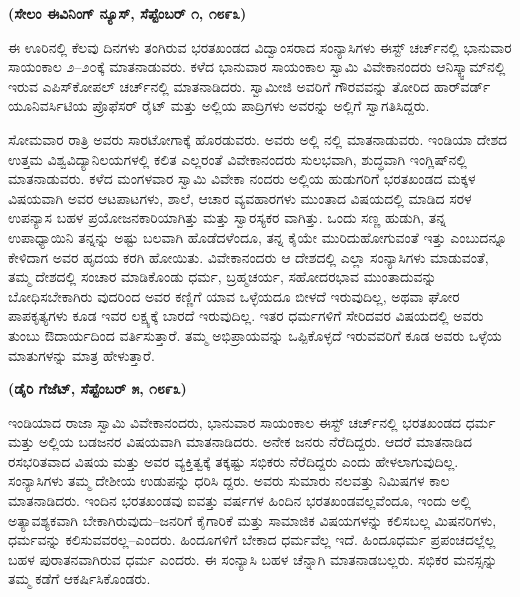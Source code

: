 \delimiter

\begin{center}
\textbf{(ಸೇಲಂ ಈವಿನಿಂಗ್​ ನ್ಯೂಸ್​, ಸೆಪ್ಟೆಂಬರ್​ ೧, ೧೮೯೩)}
\end{center}

ಈ ಊರಿನಲ್ಲಿ ಕೆಲವು ದಿನಗಳು ತಂಗಿರುವ ಭರತಖಂಡದ ವಿದ್ವಾಂಸರಾದ ಸಂನ್ಯಾಸಿಗಳು ಈಸ್ಟ್​ ಚರ್ಚ್​ನಲ್ಲಿ ಭಾನುವಾರ ಸಾಯಂಕಾಲ ೨–೨೦ಕ್ಕೆ ಮಾತನಾಡುವರು. ಕಳೆದ ಭಾನುವಾರ ಸಾಯಂಕಾಲ ಸ್ವಾಮಿ ವಿವೇಕಾನಂದರು ಆನಿಸ್ಕ್ವಾಮ್​ನಲ್ಲಿ ಇರುವ ಎಪಿಸ್​ಕೋಪಲ್​ ಚರ್ಚ್​ನಲ್ಲಿ ಮಾತನಾಡಿದರು. ಸ್ವಾಮೀಜಿ ಅವರಿಗೆ ಗೌರವವನ್ನು ತೋರಿದ ಹಾರ್​ವರ್ಡ್​ ಯೂನಿವರ್ಸಿಟಿಯ ಪ್ರೊಫೆಸರ್​ ರೈಟ್​ ಮತ್ತು ಅಲ್ಲಿಯ ಪಾದ್ರಿಗಳು ಅವರನ್ನು ಅಲ್ಲಿಗೆ ಸ್ವಾಗತಿಸಿದ್ದರು.

ಸೋಮವಾರ ರಾತ್ರಿ ಅವರು ಸಾರಟೋಗಾಕ್ಕೆ ಹೊರಡುವರು. ಅವರು ಅಲ್ಲಿ  ನಲ್ಲಿ ಮಾತನಾಡುವರು. ಇಂಡಿಯಾ ದೇಶದ ಉತ್ತಮ ವಿಶ್ವವಿದ್ಯಾನಿಲಯಗಳಲ್ಲಿ ಕಲಿತ ಎಲ್ಲರಂತೆ ವಿವೇಕಾನಂದರು ಸುಲಭವಾಗಿ, ಶುದ್ಧವಾಗಿ ಇಂಗ್ಲಿಷ್​ನಲ್ಲಿ ಮಾತನಾಡುವರು. ಕಳೆದ ಮಂಗಳವಾರ ಸ್ವಾಮಿ ವಿವೇಕಾ ನಂದರು ಅಲ್ಲಿಯ ಹುಡುಗರಿಗೆ ಭರತಖಂಡದ ಮಕ್ಕಳ ವಿಷಯವಾಗಿ ಅವರ ಆಟಪಾಟಗಳು, ಶಾಲೆ, ಆಚಾರ ವ್ಯವಹಾರಗಳು ಮುಂತಾದ ವಿಷಯದಲ್ಲಿ ಮಾಡಿದ ಸರಳ ಉಪನ್ಯಾಸ ಬಹಳ ಪ್ರಯೋಜನಕಾರಿಯಾಗಿತ್ತು ಮತ್ತು ಸ್ವಾರಸ್ಯಕರ ವಾಗಿತ್ತು. ಒಂದು ಸಣ್ಣ ಹುಡುಗಿ, ತನ್ನ ಉಪಾಧ್ಯಾಯಿನಿ ತನ್ನನ್ನು ಅಷ್ಟು ಬಲವಾಗಿ ಹೊಡೆದಳೆಂದೂ, ತನ್ನ ಕೈಯೇ ಮುರಿದುಹೋಗುವಂತೆ ಇತ್ತು ಎಂಬುದನ್ನೂ ಕೇಳಿದಾಗ ಅವರ ಹೃದಯ ಕರಗಿ ಹೋಯಿತು. ವಿವೇಕಾನಂದರು ಆ ದೇಶದಲ್ಲಿ ಎಲ್ಲಾ ಸಂನ್ಯಾಸಿಗಳು ಮಾಡುವಂತೆ, ತಮ್ಮ ದೇಶದಲ್ಲಿ ಸಂಚಾರ ಮಾಡಿಕೊಂಡು ಧರ್ಮ, ಬ್ರಹ್ಮಚರ್ಯ, ಸಹೋದರಭಾವ ಮುಂತಾದುವನ್ನು ಬೋಧಿಸಬೇಕಾಗಿರು ವುದರಿಂದ ಅವರ ಕಣ್ಣಿಗೆ ಯಾವ ಒಳ್ಳೆಯದೂ ಬೀಳದೆ ಇರುವುದಿಲ್ಲ, ಅಥವಾ ಘೋರ ಪಾಪಕೃತ್ಯಗಳು ಕೂಡ ಇವರ ಲಕ್ಷ್ಯಕ್ಕೆ ಬಾರದೆ ಇರುವುದಿಲ್ಲ. ಇತರ ಧರ್ಮಗಳಿಗೆ ಸೇರಿದವರ ವಿಷಯದಲ್ಲಿ ಅವರು ತುಂಬು ಔದಾರ್ಯದಿಂದ ವರ್ತಿಸುತ್ತಾರೆ. ತಮ್ಮ ಅಭಿಪ್ರಾಯವನ್ನು ಒಪ್ಪಿಕೊಳ್ಳದೆ ಇರುವವರಿಗೆ ಕೂಡ ಅವರು ಒಳ್ಳೆಯ ಮಾತುಗಳನ್ನು ಮಾತ್ರ ಹೇಳುತ್ತಾರೆ.

\delimiter

\begin{center}
\textbf{(ಡೈರಿ ಗೆಜೆಟ್​, ಸೆಪ್ಟೆಂಬರ್​ ೫, ೧೮೯೩)}
\end{center}

ಇಂಡಿಯಾದ ರಾಜಾ ಸ್ವಾಮಿ ವಿವೇಕಾನಂದರು, ಭಾನುವಾರ ಸಾಯಂಕಾಲ ಈಸ್ಟ್​ ಚರ್ಚ್​ನಲ್ಲಿ ಭರತಖಂಡದ ಧರ್ಮ ಮತ್ತು ಅಲ್ಲಿಯ ಬಡಜನರ ವಿಷಯವಾಗಿ ಮಾತನಾಡಿದರು. ಅನೇಕ ಜನರು ನೆರೆದಿದ್ದರು. ಆದರೆ ಮಾತನಾಡಿದ ರಸಭರಿತವಾದ ವಿಷಯ ಮತ್ತು ಅವರ ವ್ಯಕ್ತಿತ್ವಕ್ಕೆ ತಕ್ಕಷ್ಟು ಸಭಿಕರು ನೆರೆದಿದ್ದರು ಎಂದು ಹೇಳಲಾಗುವುದಿಲ್ಲ. ಸಂನ್ಯಾಸಿಗಳು ತಮ್ಮ ದೇಶೀಯ ಉಡುಪನ್ನು ಧರಿಸಿ ದ್ದರು. ಅವರು ಸುಮಾರು ನಲವತ್ತು ನಿಮಿಷಗಳ ಕಾಲ ಮಾತನಾಡಿದರು. ಇಂದಿನ ಭರತಖಂಡವು ಐವತ್ತು ವರ್ಷಗಳ ಹಿಂದಿನ ಭರತಖಂಡವಲ್ಲವೆಂದೂ, ಇಂದು ಅಲ್ಲಿ ಅತ್ಯಾವಶ್ಯಕವಾಗಿ ಬೇಕಾಗಿರುವುದು–ಜನರಿಗೆ ಕೈಗಾರಿಕೆ ಮತ್ತು ಸಾಮಾಜಿಕ ವಿಷಯಗಳನ್ನು ಕಲಿಸಬಲ್ಲ ಮಿಷನರಿಗಳು, ಧರ್ಮವನ್ನು ಕಲಿಸುವವರಲ್ಲ–ಎಂದರು. ಹಿಂದೂಗಳಿಗೆ ಬೇಕಾದ ಧರ್ಮವೆಲ್ಲ ಇದೆ. ಹಿಂದೂಧರ್ಮ ಪ್ರಪಂಚದಲ್ಲೆಲ್ಲ ಬಹಳ ಪುರಾತನವಾಗಿರುವ ಧರ್ಮ ಎಂದರು. ಈ ಸಂನ್ಯಾಸಿ ಬಹಳ ಚೆನ್ನಾಗಿ ಮಾತನಾಡಬಲ್ಲರು. ಸಭಿಕರ ಮನಸ್ಸನ್ನು ತಮ್ಮ ಕಡೆಗೆ ಆಕರ್ಷಿಸಿಕೊಂಡರು.

